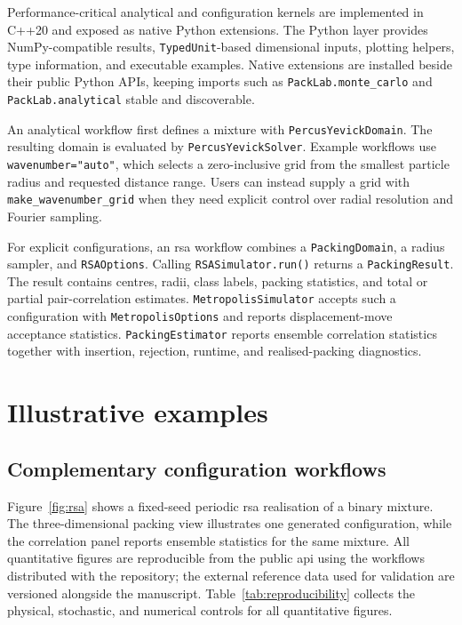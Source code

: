 \documentclass[preprint,12pt]{elsarticle}
\begin{document}
Performance-critical analytical and configuration kernels are implemented in C++20 and exposed as native Python extensions. %
The Python layer provides NumPy-compatible results, \texttt{TypedUnit}-based dimensional inputs, plotting helpers, type information, and executable examples. %
Native extensions are installed beside their public Python APIs, keeping imports such as \texttt{PackLab.monte\_carlo} and \texttt{PackLab.analytical} stable and discoverable. %

An analytical workflow first defines a mixture with \texttt{PercusYevickDomain}. %
The resulting domain is evaluated by \texttt{PercusYevickSolver}. %
Example workflows use \texttt{wavenumber="auto"}, which selects a zero-inclusive grid from the smallest particle radius and requested distance range. %
Users can instead supply a grid with \texttt{make\_wavenumber\_grid} when they need explicit control over radial resolution and Fourier sampling. %

For explicit configurations, an \gls{rsa} workflow combines a \texttt{PackingDomain}, a radius sampler, and \texttt{RSAOptions}. %
Calling \texttt{RSASimulator.run()} returns a \texttt{PackingResult}. %
The result contains centres, radii, class labels, packing statistics, and total or partial pair-correlation estimates. %
\texttt{MetropolisSimulator} accepts such a configuration with \texttt{MetropolisOptions} and reports displacement-move acceptance statistics. %
\texttt{PackingEstimator} reports ensemble correlation statistics together with insertion, rejection, runtime, and realised-packing diagnostics. %

\FloatBarrier
\section{Illustrative examples}

\subsection{Complementary configuration workflows}

Figure~\ref{fig:rsa} shows a fixed-seed periodic \gls{rsa} realisation of a binary mixture. %
The three-dimensional packing view illustrates one generated configuration, while the correlation panel reports ensemble statistics for the same mixture. %
All quantitative figures are reproducible from the public \gls{api} using the
workflows distributed with the repository; the external reference data used
for validation are versioned alongside the manuscript. %
Table~\ref{tab:reproducibility} collects the physical, stochastic, and numerical
controls for all quantitative figures. %
\end{document}
